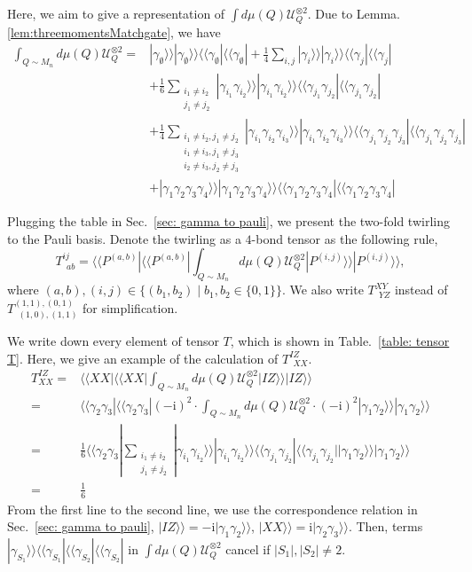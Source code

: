 \documentclass{article}
\newcommand{\supket}[1]{|#1 \rangle\rangle}
\newcommand{\supbra}[1]{\langle\langle #1 |}
\newcommand{\Ucal}{\mathcal{U}}
\newcommand{\ii}{\mathrm{i}}
\begin{document}
\newcommand{\supketbra}[2]{
    \supket{#1 } \supket{#1 } \supbra{#2} \supbra{#2} 
}
\newcommand{\T}[2]{ T^{#1}_{~~#2}  }
Here, we aim to give a representation of $\int d\mu(Q)\Ucal_Q^{\otimes 2}$. Due to Lemma. \ref{lem:threemomentsMatchgate}, we have
\begin{align*}
    \int_{Q\sim M_n} d\mu(Q)\Ucal_Q^{\otimes 2} =& \supketbra{\gamma_\emptyset}{\gamma_\emptyset}
    + \frac{1}{4} \sum_{i,j} \supketbra{\gamma_i}{\gamma_j}\\
    &+ \frac{1}{6}\sum_{\substack{i_1\neq i_2 \\ j_1\neq j_2}}\supketbra{\gamma_{i_1}\gamma_{i_2}}{\gamma_{j_1}\gamma_{j_2}} \\
    &+ \frac{1}{4}
    \sum_{\substack{i_1\neq i_2, j_1 \neq j_2 \\ 
        i_1\neq i_3, j_1 \neq j_3 \\
        i_2\neq i_3, j_2 \neq j_3} 
    }
    \supketbra{\gamma_{i_1}\gamma_{i_2}\gamma_{i_3}}{\gamma_{j_1}\gamma_{j_2}\gamma_{j_3}}\\
    &+ \supketbra{\gamma_1\gamma_2\gamma_3\gamma_4}{\gamma_1\gamma_2\gamma_3\gamma_4}
\end{align*}

Plugging the table in Sec.~\ref{sec: gamma to pauli}, we present the two-fold twirling to the Pauli basis. Denote the twirling as a $4$-bond tensor as the following rule,
\begin{equation}
    \T{ij}{ab} = \supbra{P^{(a,b)}}\supbra{P^{(a,b)}}\int_{Q\sim M_n} d\mu(Q)\Ucal_Q^{\otimes 2} \supket{P^{(i,j)}}\supket{P^{(i,j)}},
\end{equation}
where $(a,b), (i,j)\in \{(b_1, b_2)\mid b_1, b_2 \in \{0,1\}\}$. We also write $\T{XY}{YZ}$ instead of $\T{(1,1), (0,1)}{(1,0), (1,1)}$ for simplification. 

We write down every element of tensor $T$, which is shown in Table.~\ref{table: tensor T}. 
Here, we give an example of the calculation of $\T{IZ}{XX}$. 
\begin{align*}
    T^{IZ}_{XX} =& \supbra{XX}\supbra{XX} \int_{Q\sim M_n} d\mu(Q)\Ucal_Q^{\otimes 2} \supket{IZ}\supket{IZ}\\
    =& \supbra{\gamma_2\gamma_3}\supbra{\gamma_2\gamma_3} (-\ii)^2 \cdot \int_{Q\sim M_n} d\mu(Q)\Ucal_Q^{\otimes 2} \cdot (-\ii)^2 \supket{\gamma_1\gamma_2}\supket{\gamma_1\gamma_2}\\
    =& \frac{1}{6}\supbra{\gamma_2\gamma_3} \sum_{\substack{i_1\neq i_2 \\ j_1\neq j_2}}\supketbra{\gamma_{i_1}\gamma_{i_2}}{\gamma_{j_1}\gamma_{j_2}} \supket{\gamma_1\gamma_2}\supket{\gamma_1\gamma_2}\\
    = & \frac{1}{6}
\end{align*}
From the first line to the second line, we use the correspondence relation in Sec.~\ref{sec: gamma to pauli}, $\supket{IZ} = -\ii \supket{\gamma_1\gamma_2}$, $\supket{XX} = \ii \supket{\gamma_2\gamma_3}$. Then, terms $\supket{\gamma_{S_1}}\supbra{\gamma_{S_1}}\supbra{\gamma_{S_2}}\supbra{\gamma_{S_2}}$ in $\int d\mu(Q)\Ucal_Q^{\otimes 2}$ cancel if $|S_1|,  |S_2| \neq 2$.   
\end{document}
